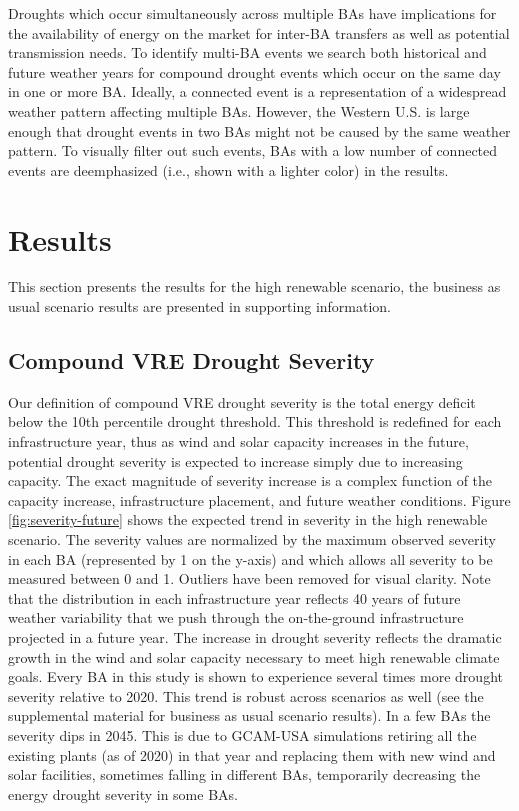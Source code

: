 \documentclass{agujournal2019}
\begin{document}
Droughts which occur simultaneously across multiple BAs have implications for the availability of energy on the market for inter-BA transfers as well as potential transmission needs. To identify multi-BA events we search both historical and future weather years for compound drought events which occur on the same day in one or more BA. Ideally, a connected event is a representation of a widespread weather pattern affecting multiple BAs. However, the Western U.S. is large enough that drought events in two BAs might not be caused by the same weather pattern. To visually filter out such events, BAs with a low number of connected events are deemphasized (i.e., shown with a lighter color) in the results. 

\section{Results}

This section presents the results for the high renewable scenario, the business as usual scenario results are presented in supporting information. 

\subsection{Compound VRE Drought Severity}

Our definition of compound VRE drought severity is the total energy deficit below the 10th percentile drought threshold. This threshold is redefined for each infrastructure year, thus as wind and solar capacity increases in the future, potential drought severity is expected to increase simply due to increasing capacity. The exact magnitude of severity increase is a complex function of the capacity increase, infrastructure placement, and future weather conditions. Figure \ref{fig:severity-future} shows the expected trend in severity in the high renewable scenario. The severity values are normalized by the maximum observed severity in each BA (represented by 1 on the y-axis) and which allows all severity to be measured between 0 and 1. Outliers have been removed for visual clarity. Note that the distribution in each infrastructure year reflects 40 years of future weather variability that we push through the on-the-ground infrastructure projected in a future year. The increase in drought severity reflects the dramatic growth in the wind and solar capacity necessary to meet high renewable climate goals. Every BA in this study is shown to experience several times more drought severity relative to 2020. This trend is robust across scenarios as well (see the supplemental material for business as usual scenario results). In a few BAs the severity dips in 2045. This is due to GCAM-USA simulations retiring all the existing plants (as of 2020) in that year and replacing them with new wind and solar facilities, sometimes falling in different BAs, temporarily decreasing the energy drought severity in some BAs. 
\end{document}
